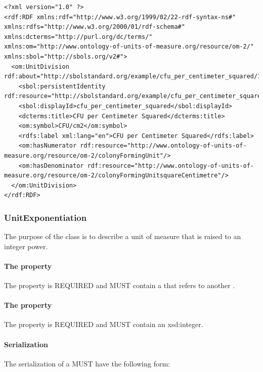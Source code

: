 \begin{lstlisting}
<?xml version="1.0" ?>
<rdf:RDF xmlns:rdf="http://www.w3.org/1999/02/22-rdf-syntax-ns#" xmlns:rdfs="http://www.w3.org/2000/01/rdf-schema#" xmlns:dcterms="http://purl.org/dc/terms/" xmlns:om="http://www.ontology-of-units-of-measure.org/resource/om-2/" xmlns:sbol="http://sbols.org/v2#">
  <om:UnitDivision rdf:about="http://sbolstandard.org/example/cfu_per_centimeter_squared/1">
    <sbol:persistentIdentity rdf:resource="http://sbolstandard.org/example/cfu_per_centimeter_squared"/>
    <sbol:displayId>cfu_per_centimeter_squared</sbol:displayId>
    <dcterms:title>CFU per Centimeter Squared</dcterms:title>
    <om:symbol>CFU/cm2</om:symbol>
    <rdfs:label xml:lang="en">CFU per Centimeter Squared</rdfs:label>
    <om:hasNumerator rdf:resource="http://www.ontology-of-units-of-measure.org/resource/om-2/colonyFormingUnit"/>
    <om:hasDenominator rdf:resource="http://www.ontology-of-units-of-measure.org/resource/om-2/colonyFormingUnitsquareCentimetre"/>
  </om:UnitDivision>
</rdf:RDF>
\end{lstlisting}
\label{ser:UnitDivision}

\subsubsection{UnitExponentiation}
\label{sec:UnitExponentiation}

The purpose of the  class is to describe a unit of measure that is raised to an integer power.

\paragraph{The  property}\label{sec:hasBase}
The  property is REQUIRED and MUST contain a  that refers to another .

\paragraph{The  property}\label{sec:hasExponent}
The  property is REQUIRED and MUST contain an xsd:integer.

\paragraph{Serialization}
The serialization of a  MUST have the following form:


